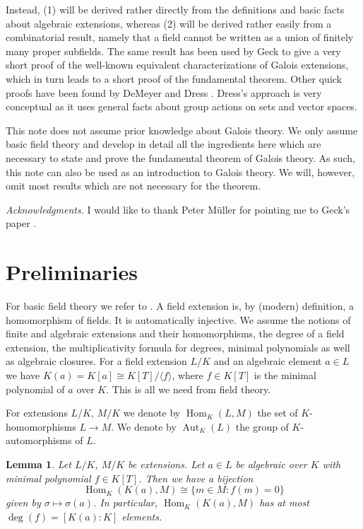 \documentclass[11pt,reqno]{amsart}
\theoremstyle{standard}
\newtheorem{lemma}{Lemma}[section]
\theoremstyle{definition}
\DeclareMathOperator{\Hom}{Hom}
\DeclareMathOperator{\Aut}{Aut}
\begin{document}
Instead, (1) will be derived rather directly from the definitions and basic facts about algebraic extensions, whereas (2) will be derived rather easily from a combinatorial result, namely that a field cannot be written as a union of finitely many proper subfields. The same result has been used by Geck \cite{Geck} to give a very short proof of the well-known equivalent characterizations of Galois extensions, which in turn leads to a short proof of the fundamental theorem. Other quick proofs have been found by DeMeyer \cite{DeMeyer} and Dress \cite{Dress}. Dress's approach is very conceptual as it uses general facts about group actions on sets and vector spaces.
 
This note does not assume prior knowledge about Galois theory. We only assume basic field theory and develop in detail all the ingredients here which are necessary to state and prove the fundamental theorem of Galois theory. As such, this note can also be used as an introduction to Galois theory. We will, however, omit most results which are not necessary for the theorem.

\emph{Acknowledgments.} I would like to thank Peter Müller for pointing me to Geck's paper \cite{Geck}.



\section{Preliminaries}

For basic field theory we refer to \cite[sect.\ VII.1, VI.2.1]{Aluffi}. A field extension is, by (modern) definition, a homomorphism of fields. It is automatically injective. We assume the notions of finite and algebraic extensions and their homomorphisms, the degree of a field extension, the multiplicativity formula for degrees, minimal polynomials as well as algebraic closures. For a field extension $L/K$ and an algebraic element $a \in L$ we have $K(a) = K[a] \cong K[T] / \langle f \rangle$, where $f \in K[T]$ is the minimal polynomial of $a$ over $K$. This is all we need from field theory.

For extensions $L/K$, $M/K$ we denote by $\Hom_K(L,M)$ the set of $K$-homomorphisms $L \to M$. We denote by $\Aut_K(L)$ the group of $K$-automorphisms of $L$.

\begin{lemma} \label{univ}
Let $L/K$, $M/K$ be extensions. Let $a \in L$ be algebraic over $K$ with minimal polynomial $f \in K[T]$. Then we have a bijection
\[\Hom_K(K(a),M) \cong \{m \in M : f(m) = 0\}\]
given by $\sigma \mapsto \sigma(a)$. In particular, $\Hom_K(K(a),M)$ has at most $\deg(f) = [K(a):K]$ elements.
\end{lemma}
\end{document}
